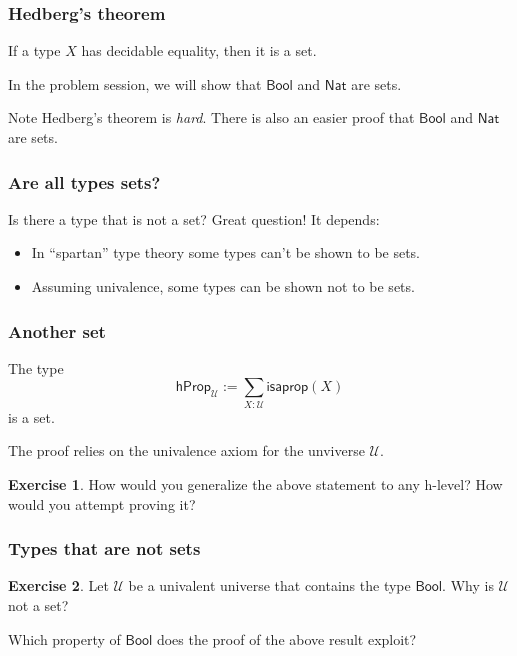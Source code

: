 \documentclass{beamer}
\newcommand{\fat}[1]{\textbf{#1}}
\newcommand{\constfont}[1]{\ensuremath{\mathsf{#1}}}
\newcommand{\U}{\mathcal{U}}
\newcommand{\Nat}{\constfont{Nat}}
\newcommand{\Bool}{\constfont{Bool}}
\newcommand{\hProp}{\constfont{hProp}}
\newcommand{\isaprop}{\constfont{isaprop}}
\theoremstyle{definition}
\newtheorem{exercise}{Exercise}
\begin{document}
\begin{frame}
  \frametitle{Hedberg's theorem}

  \begin{theorem}
   If a type $X$ has decidable equality, then it is a set.
  \end{theorem}

  In the problem session, we will show that $\Bool$ and $\Nat$ are sets.
  \pause
  \begin{block}{Note}
    Hedberg's theorem is \emph{hard}. There is also an easier proof that $\Bool$ and $\Nat$ are sets.
  \end{block}

\end{frame}

\begin{frame}
 \frametitle{Are all types sets?}
  \begin{block}{Is there a type that is not a set?}
    Great question! It depends:

    \begin{itemize}
     \item In ``spartan'' type theory some types can't be shown to be sets.
     \item Assuming univalence, some types can be shown not to be sets.
    \end{itemize}
  \end{block}
\end{frame}


\begin{frame}
 \frametitle{Another set}

  \begin{theorem}
    The type
     \[  \hProp_\U := \sum_{X : \U} \isaprop(X) \]
    is a set.
  \end{theorem}

  The proof relies on the univalence axiom for the unviverse $\U$.


  \begin{exercise}
    How would you generalize the above statement to any h-level?
    How would you attempt proving it?
  \end{exercise}

\end{frame}

\begin{frame}
 \frametitle{Types that are \fat{not} sets}

  \begin{exercise}
     Let $\U$ be a univalent universe that contains the type $\Bool$.
     Why is $\U$ not a set?
  \end{exercise}

  Which property of $\Bool$ does the proof of the above result exploit?

\end{frame}
\end{document}
